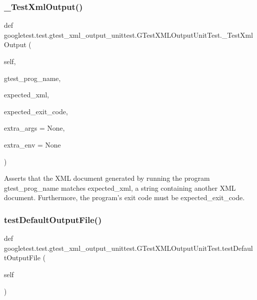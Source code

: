 \subsubsection{\texorpdfstring{\_TestXmlOutput()}{\_TestXmlOutput()}}
{\footnotesize\ttfamily def googletest.\+test.\+gtest\+\_\+xml\+\_\+output\+\_\+unittest.\+G\+Test\+X\+M\+L\+Output\+Unit\+Test.\+\_\+\+Test\+Xml\+Output (\begin{DoxyParamCaption}\item[{}]{self,  }\item[{}]{gtest\+\_\+prog\+\_\+name,  }\item[{}]{expected\+\_\+xml,  }\item[{}]{expected\+\_\+exit\+\_\+code,  }\item[{}]{extra\+\_\+args = {\ttfamily None},  }\item[{}]{extra\+\_\+env = {\ttfamily None} }\end{DoxyParamCaption})\hspace{0.3cm}{\ttfamily [private]}}

\begin{DoxyVerb}Asserts that the XML document generated by running the program
gtest_prog_name matches expected_xml, a string containing another
XML document.  Furthermore, the program's exit code must be
expected_exit_code.
\end{DoxyVerb}
 \mbox{\label{classgoogletest_1_1test_1_1gtest__xml__output__unittest_1_1_g_test_x_m_l_output_unit_test_a106abc1a0f8e69be3ed2de99b886ae3f}} 
\subsubsection{\texorpdfstring{testDefaultOutputFile()}{testDefaultOutputFile()}}
{\footnotesize\ttfamily def googletest.\+test.\+gtest\+\_\+xml\+\_\+output\+\_\+unittest.\+G\+Test\+X\+M\+L\+Output\+Unit\+Test.\+test\+Default\+Output\+File (\begin{DoxyParamCaption}\item[{}]{self }\end{DoxyParamCaption})}

